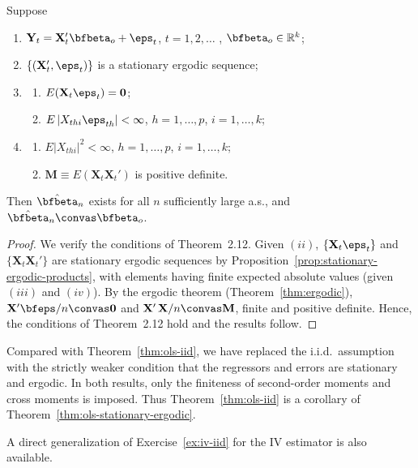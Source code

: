 \begin{theorem}\label{thm:ols-stationary-ergodic}
Suppose
\begin{enumerate}[label=(\roman*)]
\item $\mathbf{Y}_t = \mathbf{X}_t' \bfbeta_o + \eps_t$, \quad $t = 1, 2, \ldots$ , $\bfbeta_o \in \mathbb{R}^k$;
\item $\{(\mathbf{X}_t', \eps_t)\}$ is a stationary ergodic sequence;
\item \begin{enumerate}[label=(\alph*)]
\item $E(\mathbf{X}_t \eps_t) = \mathbf{0}$;
\item $E\,|X_{thi} \eps_{th}| < \infty$, $h = 1, \ldots, p$, $i = 1, \ldots, k$;
\end{enumerate}
\item \begin{enumerate}[label=(\alph*)]
\item $E|X_{thi}|^2 < \infty$, $h = 1, \ldots, p$, $i = 1, \ldots, k$;
\item $\mathbf{M} \equiv E(\mathbf{X}_t \mathbf{X}_t')$ is positive definite.
\end{enumerate}
\end{enumerate}
Then $\hat{\bfbeta}_n$ exists for all $n$ sufficiently large a.s., and $\hat{\bfbeta}_n \convas \bfbeta_o$.
\end{theorem}

\begin{proof}
We verify the conditions of Theorem~2.12. Given $(ii)$, $\{\mathbf{X}_t \eps_t\}$ and $\{\mathbf{X}_t \mathbf{X}_t'\}$ are stationary ergodic sequences by Proposition~\ref{prop:stationary-ergodic-products}, with elements having finite expected absolute values (given $(iii)$ and $(iv)$). By the ergodic theorem (Theorem~\ref{thm:ergodic}), $\mathbf{X}'\bfeps/n \convas \mathbf{0}$ and $\mathbf{X}'\,\mathbf{X}/n \convas \mathbf{M}$, finite and positive definite. Hence, the conditions of Theorem~2.12 hold and the results follow. \qedhere
\end{proof}

Compared with Theorem~\ref{thm:ols-iid}, we have replaced the i.i.d.\ assumption with the strictly weaker condition that the regressors and errors are stationary and ergodic. In both results, only the finiteness of second-order moments and cross moments is imposed. Thus Theorem~\ref{thm:ols-iid} is a corollary of Theorem~\ref{thm:ols-stationary-ergodic}.

A direct generalization of Exercise~\ref{ex:iv-iid} for the IV estimator is also available.

